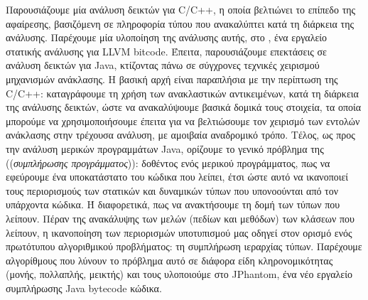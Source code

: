 Παρουσιάζουμε μία ανάλυση δεικτών για {\en C/C++}, η οποία βελτιώνει
το επίπεδο της αφαίρεσης, βασιζόμενη σε πληροφορία τύπου που
ανακαλύπτει κατά τη διάρκεια της ανάλυσης. Παρέχουμε μία υλοποίηση της
ανάλυσης αυτής, στο {\en \cclyzer{}}, ένα εργαλείο στατικής ανάλυσης
για {\en LLVM bitcode}.
%
Έπειτα, παρουσιάζουμε επεκτάσεις σε ανάλυση δεικτών για {\en Java},
κτίζοντας πάνω σε σύγχρονες τεχνικές χειρισμού μηχανισμών ανάκλασης. Η
βασική αρχή είναι παραπλήσια με την περίπτωση της {\en C/C++}:
καταγράφουμε τη χρήση των ανακλαστικών αντικειμένων, κατά τη διάρκεια
της ανάλυσης δεικτών, ώστε να ανακαλύψουμε βασικά δομικά τους
στοιχεία, τα οποία μπορούμε να χρησιμοποιήσουμε έπειτα για να
βελτιώσουμε τον χειρισμό των εντολών ανάκλασης στην τρέχουσα ανάλυση,
με αμοιβαία αναδρομικό τρόπο.
%
Τέλος, ως προς την ανάλυση μερικών προγραμμάτων {\en Java}, ορίζουμε
το γενικό πρόβλημα της ((\emph{συμπλήρωσης προγράμματος})): δοθέντος
ενός μερικού προγράμματος, πως να εφεύρουμε ένα υποκατάστατο του
κώδικα που λείπει, έτσι ώστε αυτό να ικανοποιεί τους περιορισμούς των
στατικών και δυναμικών τύπων που υπονοούνται από τον υπάρχοντα
κώδικα. Ή διαφορετικά, πως να ανακτήσουμε τη δομή των τύπων που
λείπουν. Πέραν της ανακάλυψης των μελών (πεδίων και μεθόδων) των
κλάσεων που λείπουν, η ικανοποίηση των περιορισμών υποτυπισμού μας
οδηγεί στον ορισμό ενός πρωτότυπου αλγοριθμικού προβλήματος: τη
συμπλήρωση ιεραρχίας τύπων. Παρέχουμε αλγορίθμους που λύνουν το
πρόβλημα αυτό σε διάφορα είδη κληρονομικότητας (μονής, πολλαπλής,
μεικτής) και τους υλοποιούμε στο {\en JPhantom}, ένα νέο εργαλείο
συμπλήρωσης {\en Java bytecode} κώδικα.

